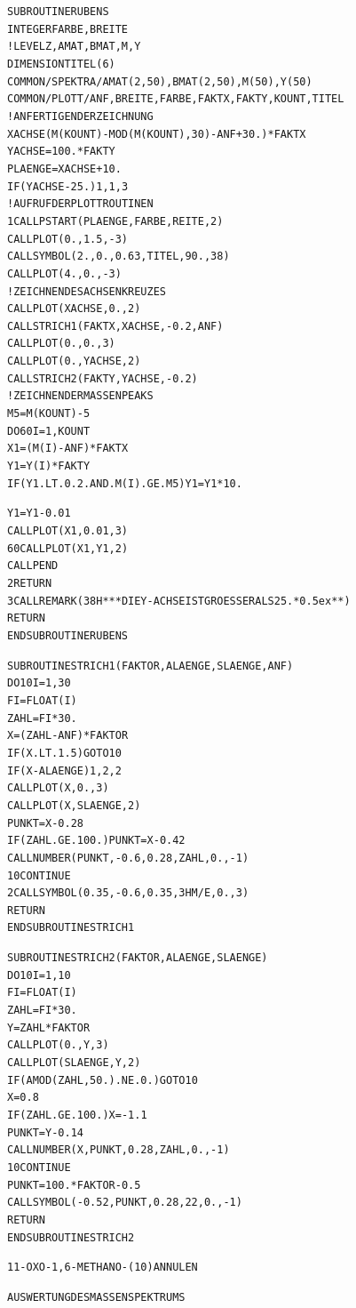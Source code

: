 \documentclass[a4paper,11pt]{article}
\begin{document}
\begin{alltt}
      SUBROUTINE RUBENS
      INTEGER FARBE,BREITE
!     LEVELZ,AMAT,BMAT,M,Y
      DIMENSION TITEL(6)
      COMMON/SPEKTRA/AMAT(2,50),BMAT(2,50),M(50),Y(50)
      COMMON/PLOTT/ANF,BREITE,FARBE,FAKTX,FAKTY,KOUNT,TITEL
!     ANFERTIGEN DER ZEICHNUNG
      XACHSE (M(KOUNT)-MOD(M(KOUNT),30)-ANF+30.)*FAKTX
      YACHSE = 100.*FAKTY
      PLAENGE = XACHSE+10.
      IF (YACHSE-25.) 1, 1, 3
!     AUFRUF DER PLOTTROUTINEN
    1 CALL PSTART (PLAENGE,FARBE,REITE,2)
      CALL PLOT (0.,1.5,-3)
      CALL SYMBOL (2.,0.,0.63,TITEL,90.,38)
      CALL PLOT (4.,0.,-3)
!     ZEICHNEN DES ACHSENKREUZES
      CALL PLOT (XACHSE,0.,2)
      CALL STRICH1 (FAKTX,XACHSE,-0.2,ANF)
      CALL PLOT (0.,0.,3)
      CALL PLOT (0.,YACHSE,2)
      CALL STRICH2 (FAKTY,YACHSE,-0.2)
!     ZEICHNEN DER MASSENPEAKS
      M5 = M(KOUNT) - 5
      DO 60 I=1,KOUNT
      X1 = (M(I)-ANF)*FAKTX
      Y1 = Y(I)*FAKTY
      IF (Y1.LT.0.2.AND.M(I).GE.M5) Y1 = Y1*10.
\newpage
{}


      Y1 = Y1 - 0.01
      CALL PLOT (X1,0.01,3)
  60  CALL PLOT (X1,Y1,2)
      CALL PEND
    2 RETURN
    3 CALL REMARK (38H***DIE Y-ACHSE IST GROESSER ALS 25.*\leavevmode\raise0.5ex\hbox{**})
      RETURN
      END SUBROUTINE RUBENS

      SUBROUTINE STRICH1 (FAKTOR,ALAENGE,SLAENGE,ANF)
      DO 10 I=1,30
      FI = FLOAT(I)
      ZAHL = FI*30.
      X = (ZAHL-ANF)*FAKTOR
      IF (X.LT.1.5) GO TO 10
      IF (X-ALAENGE) 1, 2, 2
      CALL PLOT (X,0.,3)
      CALL PLOT (X,SLAENGE,2)
      PUNKT = X - 0.28
      IF (ZAHL.GE.100.) PUNKT = X - 0.42
      CALL NUMBER (PUNKT,-0.6,0.28,ZAHL,0.,-1)
   10 CONTINUE
    2 CALL SYMBOL (0.35,-0.6,0.35,3HM/E,0.,3)
      RETURN
      END SUBROUTINE STRICH1

      SUBROUTINE STRICH2 (FAKTOR,ALAENGE,SLAENGE)
      DO 10 I=1,10
      FI = FLOAT(I)
      ZAHL = FI*30.
      Y = ZAHL*FAKTOR
      CALL PLOT (0.,Y,3)
      CALL PLOT (SLAENGE,Y,2)
      IF (AMOD(ZAHL,50.).NE.0.) GO TO 10
      X = 0.8
      IF (ZAHL.GE.100.) X = -1.1
      PUNKT = Y - 0.14
      CALL NUMBER (X,PUNKT,0.28,ZAHL,0.,-1)
   10 CONTINUE
      PUNKT = 100.*FAKTOR - 0.5
      CALL SYMBOL (-0.52,PUNKT,0.28,22,0.,-1)
      RETURN
      END SUBROUTINE STRICH2
\newpage
{}


11-OXO-1,6-METHANO-(10)ANNULEN

        AUSWERTUNG DES MASSENSPEKTRUMS


\end{alltt}
\end{document}
